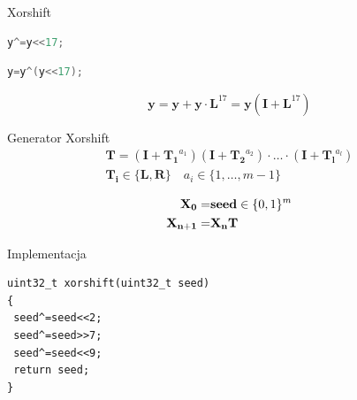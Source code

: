 \documentclass{mp}
\renewcommand{\vec}[1]{\mathbf{#1}}
\begin{document}
\begin{frame}[fragile]{Xorshift}
\begin{lstlisting}[language=C]
y^=y<<17;
\end{lstlisting}
\pause
\begin{lstlisting}[language=C]
y=y^(y<<17);
\end{lstlisting}
\pause
\[ \vec{y}=\vec{y}+\vec{y}\cdot \vec{L}^{17}=\vec{y}(\vec{I}+\vec{L}^{17}) \]
\pause
{}
\begin{block}{Generator Xorshift}
\begin{gather*}
\vec{T} = (\vec{I}+\vec{T_1}^{a_1})(\vec{I}+\vec{T_2}^{a_2})\cdot\ldots\cdot(\vec{I}+\vec{T_l}^{a_l}) \\
\vec{T_i}\in \{\vec{L}, \vec{R}\} \quad a_i\in \{1,\ldots,m-1\} \\
\end{gather*}
\pause
\begin{align*}
\vec{X_0} = & \text{\textbf{seed}} \in \{0,1\}^m \\
\vec{X_{n+1}} = & \vec{X_n}\vec{T}
\end{align*}
\end{block}
\end{frame}
\begin{frame}[fragile]{Implementacja}
\begin{lstlisting}[language=C99]
uint32_t xorshift(uint32_t seed)
{
 seed^=seed<<2;
 seed^=seed>>7;
 seed^=seed<<9;
 return seed;
}
\end{lstlisting}
\end{frame}
\end{document}
